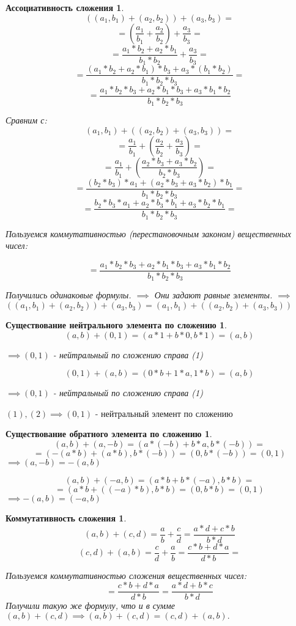 \documentclass[14pt,a4paper,oneside,russian]{article}
\newtheorem*{axiom1}{Ассоциативность сложения}
\newtheorem*{axiom2}{Существование нейтрального элемента по сложению}
\newtheorem*{axiom3}{Существование обратного элемента по сложению}
\newtheorem*{axiom4}{Коммутативность сложения}
\begin{document}
\begin{axiom1}
$$ ((a_1, b_1) + (a_2, b_2)) + (a_3, b_3) = $$
$$ = (\frac{a_1}{b_1} + \frac{a_2}{b_2}) + \frac{a_3}{b_3} = $$
$$ = \frac{a_1 * b_2 + a_2 * b_1}{b_1 * b_2} + \frac{a_3}{b_3} = $$
$$ = \frac{(a_1 * b_2 + a_2 * b_1) * b_3 + a_3 * (b_1 * b_2)}{b_1 * b_2 * b_3} = $$
$$ = \frac{a_1 * b_2 * b_3 + a_2 * b_1 * b_3 + a_3 * b_1 * b_2}{b_1 * b_2 * b_3} $$

Сравним с:
$$ ( a_1, b_1 ) + (( a_2, b_2 ) + ( a_3, b_3 )) = $$
$$ = \frac{a_1}{b_1} + (\frac{a_2}{b_2} + \frac{a_3}{b_3}) = $$
$$ = \frac{a_1}{b_1} + (\frac{a_2 * b_3 + a_3 * b_2}{b_2 * b_3}) = $$
$$ = \frac{(b_2 * b_3) * a_1 + (a_2 * b_3 + a_3 * b_2) * b_1}{b_1 * b_2 * b_3} = $$
$$ = \frac{b_2 * b_3 * a_1 + a_2 * b_3 * b_1 + a_3 * b_2 * b_1}{b_1 * b_2 * b_3} =  $$

Пользуемся коммутативностью (перестановочным законом) вещественных чисел:

$$ = \frac{a_1 * b_2 * b_3 + a_2 * b_1 * b_3 + a_3 * b_1 * b_2}{b_1 * b_2 * b_3} $$

Получились одинаковые формулы. $ \implies $ Они задают равные элементы. $ \implies $
$ ((a_1, b_1) + (a_2, b_2)) + (a_3, b_3) = (a_1, b_1) + ((a_2, b_2) + (a_3, b_3)) $

\end{axiom1}
\newpage

\begin{axiom2}
$$ (a, b) + (0, 1) = (a * 1 + b * 0, b * 1) = (a, b) $$
\begin{center}
$ \implies (0, 1) $ - нейтральный по сложению справа (1)
\end{center}
$$ (0, 1) + (a, b) = (0 * b + 1 * a, 1 * b) = (a, b) $$
\begin{center}
$ \implies (0, 1) $ - нейтральный по сложению справа (1)
\end{center}
\end{axiom2}

$ (1), (2) \implies (0, 1) $ - нейтральный элемент по сложению
\newpage

\begin{axiom3}
$$ (a, b) + (a, -b) = (a * (-b) + b * a, b * (-b)) = $$
$$ = ( -(a * b) + (a * b), b * (-b) ) = (0, b * (-b)) = (0, 1) $$
$ \implies (a, -b) = -(a, b) $

$$ (a, b) + (-a, b) = (a * b + b * (-a), b * b) = $$
$$ = (a * b + ((-a) * b), b * b) = (0, b * b) = (0, 1) $$
$ \implies -(a, b) = (-a, b) $
\end{axiom3}
\newpage

\begin{axiom4}
$$ (a, b) + (c , d) = \frac{a}{b} + \frac{c}{d} = \frac{a * d + c * b}{b * d} $$
$$ (c, d) + (a, b) = \frac{c}{d} + \frac{a}{b} = \frac{c * b + d * a}{d * b} = $$

Пользуемся коммутативностью сложения вещественных чисел:
$$ = \frac{c * b + d * a}{d * b} = \frac{a * d + b * c}{b * d} $$
Получили такую же формулу, что и в сумме $ (a, b) + (c,d) \implies (a, b) + (c,d) = (c, d) + (a, b). $
\end{axiom4}
\end{document}
